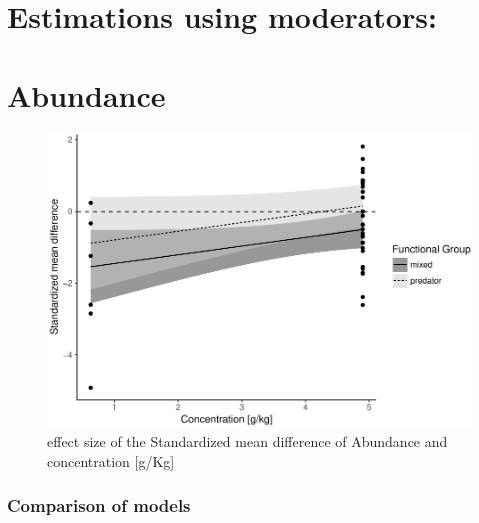 \documentclass[]{elsarticle} %
\makeatletter
\def\maxwidth{\ifdim\Gin@nat@width>\linewidth\linewidth
\else\Gin@nat@width\fi}
\let\Oldincludegraphics\includegraphics
\renewcommand{\includegraphics}[1]{\Oldincludegraphics[width=\maxwidth]{#1}}
\makeatother
\begin{document}
\section{Estimations using
moderators:}\label{estimations-using-moderators}

\section{Abundance}\label{abundance}

\begin{figure}[htbp]
\centering
\includegraphics{MetanalysisNeonics_files/figure-latex/unnamed-chunk-10-1.pdf}
\caption{effect size of the Standardized mean difference of Abundance
and concentration {[}g/Kg{]}}
\end{figure}

\subsubsection{Comparison of models}\label{comparison-of-models}
\end{document}
